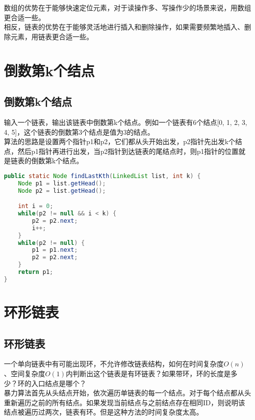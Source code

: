 数组的优势在于能够快速定位元素，对于读操作多、写操作少的场景来说，用数组更合适一些。 \\

相反，链表的优势在于能够灵活地进行插入和删除操作，如果需要频繁地插入、删除元素，用链表更合适一些。

\newpage

\section{倒数第k个结点}

\subsection{倒数第k个结点}

输入一个链表，输出该链表中倒数第k个结点。例如一个链表有6个结点[0, 1, 2, 3, 4, 5]，这个链表的倒数第3个结点是值为3的结点。 \\

算法的思路是设置两个指针p1和p2，它们都从头开始出发，p2指针先出发k个结点，然后p1指针再进行出发，当p2指针到达链表的尾结点时，则p1指针的位置就是链表的倒数第k个结点。 \\


\begin{lstlisting}[language=Java]
public static Node findLastKth(LinkedList list, int k) {
    Node p1 = list.getHead();
    Node p2 = list.getHead();

    int i = 0;
    while(p2 != null && i < k) {
        p2 = p2.next;
        i++;
    }
    while(p2 != null) {
        p1 = p1.next;
        p2 = p2.next;
    }
    return p1;
}
\end{lstlisting}

\newpage

\section{环形链表}

\subsection{环形链表}

一个单向链表中有可能出现环，不允许修改链表结构，如何在时间复杂度$ O(n) $、空间复杂度$ O(1) $内判断出这个链表是有环链表？如果带环，环的长度是多少？环的入口结点是哪个？ \\

暴力算法首先从头结点开始，依次遍历单链表的每一个结点。对于每个结点都从头重新遍历之前的所有结点。如果发现当前结点与之前结点存在相同ID，则说明该结点被遍历过两次，链表有环。但是这种方法的时间复杂度太高。 \\

